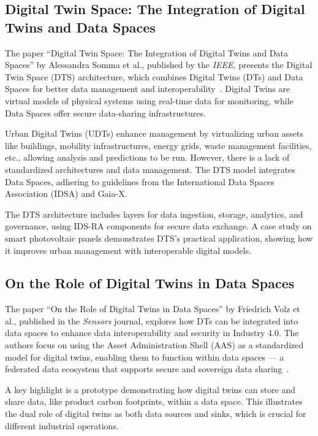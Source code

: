\subsection{Digital Twin Space: The Integration of Digital Twins and Data Spaces}\label{subsec:digital-twin-space:-the-integration-of-digital-twins-and-data-spaces}

The paper ``Digital Twin Space: The Integration of Digital Twins and Data Spaces'' by Alessandra Somma et al., published by the \textit{IEEE}, presents the Digital Twin Space (DTS) architecture, which combines Digital Twins (DTs) and Data Spaces for better data management and interoperability~\cite{digital_twins_and_data_spaces}.
Digital Twins are virtual models of physical systems using real-time data for monitoring, while Data Spaces offer secure data-sharing infrastructures.

Urban Digital Twins (UDTs) enhance management by virtualizing urban assets like buildings, mobility infrastructures, energy grids, waste management facilities, etc., allowing analysis and predictions to be run.
However, there is a lack of standardized architectures and data management.
The DTS model integrates Data Spaces, adhering to guidelines from the International Data Spaces Association (IDSA) and Gaia-X.

The DTS architecture includes layers for data ingestion, storage, analytics, and governance, using IDS-RA components for secure data exchange.
A case study on smart photovoltaic panels demonstrates DTS's practical application, showing how it improves urban management with interoperable digital models.

\subsection{On the Role of Digital Twins in Data Spaces}\label{subsec:on-the-role-of-digital-twins-in-data-spaces}

The paper ``On the Role of Digital Twins in Data Spaces'' by Friedrich Volz et al., published in the \textit{Sensors} journal, explores how DTs can be integrated into data spaces to enhance data interoperability and security in Industry 4.0. The authors focus on using the Asset Administration Shell (AAS) as a standardized model for digital twins, enabling them to function within data spaces --- a federated data ecosystem that supports secure and sovereign data sharing~\cite{role_of_digital_twins_in_data_spaces}.

A key highlight is a prototype demonstrating how digital twins can store and share data, like product carbon footprints, within a data space.
This illustrates the dual role of digital twins as both data sources and sinks, which is crucial for different industrial operations.

